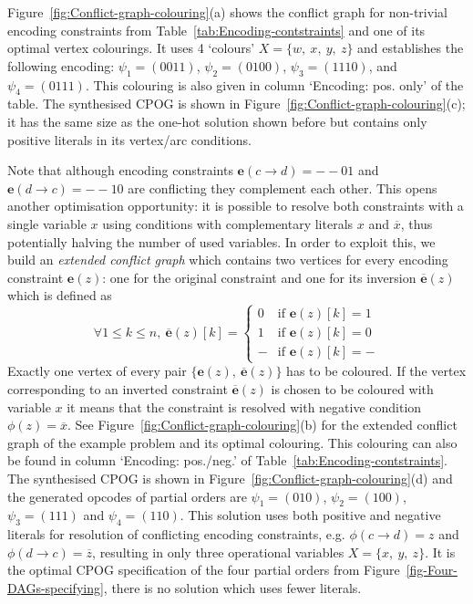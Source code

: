 Figure~\ref{fig:Conflict-graph-colouring}(a) shows the conflict
graph for non-trivial encoding constraints from Table~\ref{tab:Encoding-contstraints}
and one of its optimal vertex colourings. It uses 4 `colours' $X=\{w,\ x,\ y,\ z\}$
and establishes the following encoding: $\psi_{1}=(0011)$, $\psi_{2}=(0100)$,
$\psi_{3}=(1110)$, and $\psi_{4}=(0111)$. This colouring is also
given in column `Encoding: pos. only' of the table. The synthesised
CPOG is shown in Figure~\ref{fig:Conflict-graph-colouring}(c); it
has the same size as the one-hot solution shown before but contains
only positive literals in its vertex/arc conditions.

Note that although encoding constraints $\mathbf{e}(c\rightarrow d)=-\!-\!01$
and $\mathbf{e}(d\rightarrow c)=-\!-\!10$ are conflicting they complement
each other. This opens another optimisation opportunity: it is possible
to resolve both constraints with a single variable $x$ using conditions
with complementary literals $x$ and $\overline{x}$, thus potentially
halving the number of used variables. In order to exploit this, we
build an \emph{extended conflict graph} which contains two vertices
for every encoding constraint $\mathbf{e}(z)$: one for the original
constraint and one for its inversion $\overline{\mathbf{e}}(z)$ which
is defined as
\[
\forall1\le k\le n,\ \overline{\mathbf{e}}(z)[k]=\begin{cases}
0 & \text{if }\mathbf{e}(z)[k]=1\\
1 & \text{if }\mathbf{e}(z)[k]=0\\
- & \text{if }\mathbf{e}(z)[k]=-
\end{cases}
\]
Exactly one vertex of every pair $\{\mathbf{e}(z),\ \overline{\mathbf{e}}(z)\}$
has to be coloured. If the vertex corresponding to an inverted constraint
$\overline{\mathbf{e}}(z)$ is chosen to be coloured with variable
$x$ it means that the constraint is resolved with negative condition
$\phi(z)=\overline{x}$. See Figure~\ref{fig:Conflict-graph-colouring}(b)
for the extended conflict graph of the example problem and its optimal
colouring. This colouring can also be found in column `Encoding:
pos./neg.' of Table~\ref{tab:Encoding-contstraints}. The synthesised
CPOG is shown in Figure~\ref{fig:Conflict-graph-colouring}(d) and
the generated opcodes of partial orders are $\psi_{1}=(010)$, $\psi_{2}=(100)$,
$\psi_{3}=(111)$ and $\psi_{4}=(110)$. This solution uses both positive
and negative literals for resolution of conflicting encoding constraints,
e.g. $\phi(c\rightarrow d)=z$ and $\phi(d\rightarrow c)=\overline{z}$,
resulting in only three operational variables $X=\{x,\ y,\ z\}$.
It is the optimal CPOG specification of the four partial orders from
Figure~\ref{fig-Four-DAGs-specifying}, there is no solution which
uses fewer literals.

